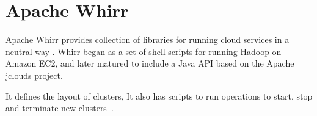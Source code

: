 \section{Apache Whirr}

Apache Whirr provides collection of libraries for running cloud
services in a neutral way . Whirr began as a set of shell scripts for
running Hadoop on Amazon EC2, and later matured to include a Java API
based on the Apache jclouds project.

It defines the layout of clusters, It also has scripts to run
operations to start, stop and terminate new 
clusters~\cite{hid-sp18-421-whirrCloud}.

